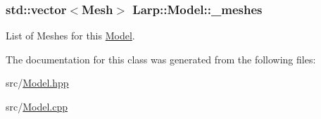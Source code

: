\subsubsection[{\texorpdfstring{\+\_\+meshes}{_meshes}}]{\setlength{\rightskip}{0pt plus 5cm}std\+::vector$<${\bf Mesh}$>$ Larp\+::\+Model\+::\+\_\+meshes\hspace{0.3cm}{\ttfamily [private]}}\hypertarget{classLarp_1_1Model_ae75758feb59857f6b907bbfa0cf993f2}{}\label{classLarp_1_1Model_ae75758feb59857f6b907bbfa0cf993f2}
List of Meshes for this \hyperlink{classLarp_1_1Model}{Model}. 

The documentation for this class was generated from the following files\+:\begin{DoxyCompactItemize}
\item 
src/\hyperlink{Model_8hpp}{Model.\+hpp}\item 
src/\hyperlink{Model_8cpp}{Model.\+cpp}\end{DoxyCompactItemize}
